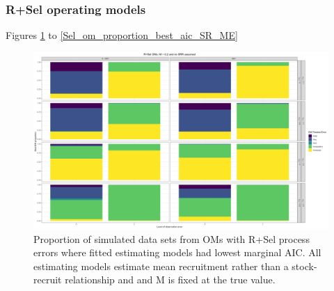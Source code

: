 \documentclass[
  12pt,
]{article}
\begin{document}
\hypertarget{rsel-operating-models-1}{%
\subsubsection*{R+Sel operating models}\label{rsel-operating-models-1}}

Figures \ref{Sel_om_proportion_best_aic_R_MF} to
\ref{Sel_om_proportion_best_aic_SR_ME}

\begin{landscape}
\begin{figure}
\caption{Proportion of simulated data sets from OMs with R+Sel process errors where fitted estimating models had lowest marginal AIC. All estimating models estimate mean recruitment rather than a stock-recruit relationship and and M is fixed at the true value.} \label{Sel_om_proportion_best_aic_R_MF}
\begin{center}
\includegraphics[width = \textwidth]{Sel_om_proportion_best_aic_R_MF.png}
\end{center}
\end{figure}
\end{landscape}
\end{document}
